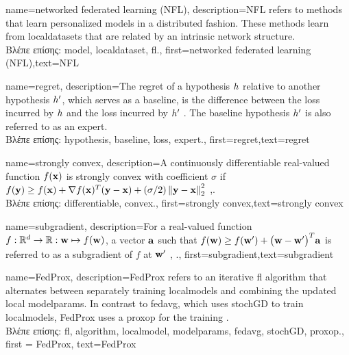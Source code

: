 {name={networked federated learning (NFL)},
	description={NFL refers 
		to methods that learn personalized \gls{model}s in a distributed fashion. These methods learn from \gls{localdataset}s 
		that are related by an intrinsic network structure.\\
		\foreignlanguage{greek}{Βλέπε επίσης:} \gls{model}, \gls{localdataset}, \gls{fl}.},
 first={networked federated learning (NFL)},text={NFL} 
}

{name={regret},
	description={The regret of a \gls{hypothesis} $h$ relative to 
		another \gls{hypothesis} $h'$, which serves as a \gls{baseline}, 
		is the difference between the \gls{loss} incurred by $h$ and the \gls{loss} 
		incurred by $h'$ \cite{PredictionLearningGames}. 
		The \gls{baseline} \gls{hypothesis} $h'$ is also referred to as an \gls{expert}.\\
		\foreignlanguage{greek}{Βλέπε επίσης:} \gls{hypothesis}, \gls{baseline}, \gls{loss}, \gls{expert}.},
	first={regret},text={regret} 
}

{name={strongly convex},
	description={A continuously \gls{differentiable} real-valued 
		function $f({\bf x})$ is strongly \gls{convex} with coefficient $\sigma$ if $f({\bf y}) \geq f({\bf x}) + \nabla f({\bf x})^{T} ({\bf y} - {\bf x}) + (\sigma/2) \left\Vert {{\bf y}- {\bf x}} \right\Vert_{2}^{2}$ \cite{nesterov04},\cite[Sec. B.1.1]{CvxAlgBertsekas}.\\
		\foreignlanguage{greek}{Βλέπε επίσης:} \gls{differentiable}, \gls{convex}.},
	first={strongly convex},text={strongly convex} 
}

{name={subgradient},
	description={For a real-valued function $f: \mathbb{R}^{d} \rightarrow \mathbb{R}: {\bf w} \mapsto f({\bf w})$, 
		a vector ${\bf a}$ such that $f({\bf w}) \geq  f({\bf w}') +\big({\bf w}-{\bf w}' \big)^{T} {\bf a}$ is 
		referred to as a subgradient of $f$ at ${\bf w}'$ \cite{BertCvxAnalOpt}, \cite{BertsekasNonLinProgr}.},
	first={subgradient},text={subgradient} 
}

{name={FedProx},
	description={FedProx refers to an iterative \gls{fl} \gls{algorithm} that alternates between separately training \gls{localmodel}s and combining the updated 
		local \gls{modelparams}. In contrast to \gls{fedavg}, which uses 
		\gls{stochGD} to train \gls{localmodel}s, FedProx uses a \gls{proxop} for the training \cite{FedProx2020}.\\
		\foreignlanguage{greek}{Βλέπε επίσης:} \gls{fl}, \gls{algorithm}, \gls{localmodel}, \gls{modelparams}, \gls{fedavg}, \gls{stochGD}, \gls{proxop}.}, 
	first = {FedProx}, text={FedProx} 
}


